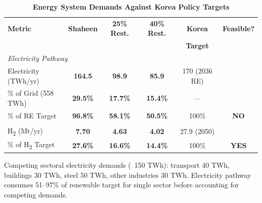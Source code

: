 \documentclass[11pt,a4paper]{article}
\begin{document}
\begin{table}[htbp]
\centering
\small
\caption{\textbf{Energy System Demands Against Korea Policy Targets}}
\label{tab:feasibility}
\begin{tabular}{@{}lccccc@{}}
\toprule
\textbf{Metric} & \textbf{Shaheen} & \textbf{25\% Rest.} & \textbf{40\% Rest.} & \textbf{Korea} & \textbf{Feasible?} \\
& & & & \textbf{Target} & \\
\midrule
\multicolumn{6}{l}{\textit{Electricity Pathway}} \\
Electricity (TWh/yr) & \textbf{164.5} & \textbf{98.9} & \textbf{85.9} & 170 (2036 RE) & \\
\% of Grid (558 TWh) & \textbf{29.5\%} & \textbf{17.7\%} & \textbf{15.4\%} & --- & \\
\% of RE Target & \cellcolor{red!20}\textbf{96.8\%} & \cellcolor{orange!20}\textbf{58.1\%} & \cellcolor{orange!20}\textbf{50.5\%} & 100\% & \cellcolor{red!20}\textbf{NO} \\
\addlinespace
\multicolumn{6}{l}{\textit{Hydrogen Pathway}} \\
H\textsubscript{2} (Mt/yr) & \textbf{7.70} & \textbf{4.63} & \textbf{4.02} & 27.9 (2050) & \\
\% of H\textsubscript{2} Target & \cellcolor{green!20}\textbf{27.6\%} & \cellcolor{green!20}\textbf{16.6\%} & \cellcolor{green!20}\textbf{14.4\%} & 100\% & \cellcolor{green!20}\textbf{YES} \\
\bottomrule
\end{tabular}
\begin{tablenotes}
\small
\item Competing sectoral electricity demands (~150 TWh): transport 40 TWh, buildings 30 TWh, steel 50 TWh, other industries 30 TWh. Electricity pathway consumes 51--97\% of renewable target for single sector before accounting for competing demands.
\end{tablenotes}
\end{table}


\end{document}

